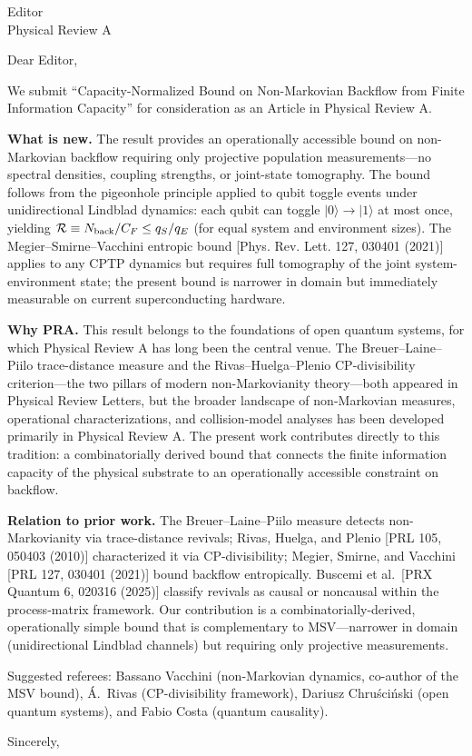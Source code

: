 \documentclass[12pt]{letter}
\begin{document}
\begin{letter}{Editor\\Physical Review A}

\opening{Dear Editor,}

We submit ``Capacity-Normalized Bound on Non-Markovian Backflow from Finite Information Capacity'' for consideration as an Article in Physical Review A.

\textbf{What is new.}
The result provides an operationally accessible bound on non-Markovian backflow requiring only projective population measurements---no spectral densities, coupling strengths, or joint-state tomography. The bound follows from the pigeonhole principle applied to qubit toggle events under unidirectional Lindblad dynamics: each qubit can toggle $|0\rangle \to |1\rangle$ at most once, yielding $\mathcal{R} \equiv N_{\rm back}/C_F \leq q_S/q_E$ (for equal system and environment sizes). The Megier--Smirne--Vacchini entropic bound [Phys. Rev. Lett. 127, 030401 (2021)] applies to any CPTP dynamics but requires full tomography of the joint system-environment state; the present bound is narrower in domain but immediately measurable on current superconducting hardware.

\textbf{Why PRA.}
This result belongs to the foundations of open quantum systems, for which Physical Review A has long been the central venue. The Breuer--Laine--Piilo trace-distance measure and the Rivas--Huelga--Plenio CP-divisibility criterion---the two pillars of modern non-Markovianity theory---both appeared in Physical Review Letters, but the broader landscape of non-Markovian measures, operational characterizations, and collision-model analyses has been developed primarily in Physical Review A. The present work contributes directly to this tradition: a combinatorially derived bound that connects the finite information capacity of the physical substrate to an operationally accessible constraint on backflow.

\textbf{Relation to prior work.}
The Breuer--Laine--Piilo measure detects non-Markovianity via trace-distance revivals; Rivas, Huelga, and Plenio [PRL 105, 050403 (2010)] characterized it via CP-divisibility; Megier, Smirne, and Vacchini [PRL 127, 030401 (2021)] bound backflow entropically. Buscemi et al.\ [PRX Quantum 6, 020316 (2025)] classify revivals as causal or noncausal within the process-matrix framework. Our contribution is a combinatorially-derived, operationally simple bound that is complementary to MSV---narrower in domain (unidirectional Lindblad channels) but requiring only projective measurements.

Suggested referees: Bassano Vacchini (non-Markovian dynamics, co-author of the MSV bound), \'A.\ Rivas (CP-divisibility framework), Dariusz Chru\'sci\'nski (open quantum systems), and Fabio Costa (quantum causality).

\closing{Sincerely,}

\end{letter}
\end{document}
